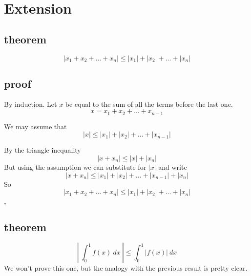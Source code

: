 \documentclass[11pt, oneside]{article}
\begin{document}
\section*{Extension}

\subsection*{theorem}

\[ |x_1 + x_2 + \dots + x_n| \le |x_1| + |x_2| + \dots + |x_n| \]

\subsection*{proof}

By induction.  Let $x$ be equal to the sum of all the terms before the last one.
\[ x = x_1 + x_2 + \dots + x_{n-1} \]

We may assume that
\[ |x| \le  |x_1| + |x_2| + \dots + |x_{n-1}| \] 

By the triangle inequality
\[ |x + x_n| \le |x| + |x_n| \]
But using the assumption we can substitute for $|x|$ and write
\[ |x + x_n| \le |x_1| + |x_2| + \dots + |x_{n-1}| + |x_n| \]
So
\[ |x_1 + x_2 + \dots + x_n| \le |x_1| + |x_2| + \dots + |x_n| \]

$\square$

\subsection*{theorem}
\[ | \ \int_0^1 f(x) \ dx \ | \le \int_0^1 |f(x)| \ dx \]
We won't prove this one, but the analogy with the previous result is pretty clear.
\end{document}
